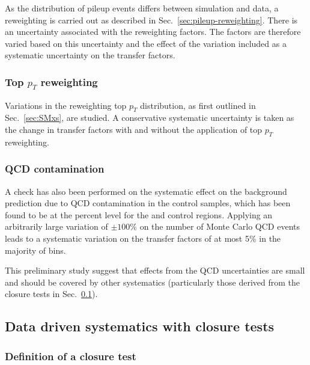 As the distribution of pileup events differs between simulation and
data, a reweighting is carried out as described in
Sec.~\ref{sec:pileup-reweighting}. There is an uncertainty associated
with the reweighting factors. The factors are therefore varied based
on this uncertainty and the effect of the variation included as a
systematic uncertainty on the transfer factors.

\subsubsection{Top $p_T$ reweighting}

Variations in the reweighting top $p_{T}$ distribution, as first outlined in 
Sec.~\ref{sec:SMxs}, are studied. A conservative systematic
uncertainty is taken as the change in transfer
factors with and without the application of top $p_T$ reweighting.

\subsubsection{QCD contamination}

A check has also been performed on the systematic effect on the
background prediction due to QCD contamination in the control samples,
which has been found to be at the percent level for the \mj and \gj
control regions. Applying an arbitrarily large variation of $\pm
100\%$ on the number of Monte Carlo QCD events leads to a systematic
variation on the transfer factors of at most 5\% in the majority of
bins.

This preliminary study suggest that effects from the QCD
uncertainties are small and should be covered by other systematics
(particularly those derived from the closure tests in
Sec.~\ref{sec:closure-tests}).



\subsection{Data driven systematics with closure tests}
\label{sec:closure-tests}

\subsubsection{Definition of a closure test}
\label{sec:closure-tests-desc}

